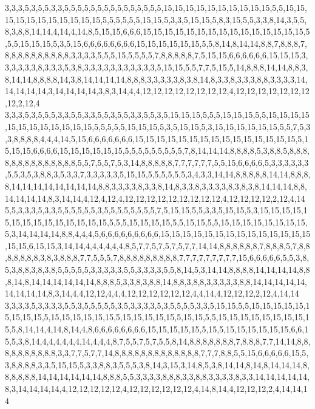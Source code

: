 3,3,3,5,3,5,5,3,3,5,5,5,5,5,5,5,5,5,5,5,5,5,5,5,15,15,15,15,15,15,15,15,15,15,5,5,15,15,15,15,15,15,15,15,15,15,15,5,5,5,5,5,5,15,15,5,3,3,5,15,15,5,8,3,15,5,5,3,3,8,14,3,5,5,8,3,8,8,14,14,4,14,4,14,8,5,15,15,6,6,6,15,15,15,15,15,15,15,15,15,15,15,15,15,15,15,5,5,5,15,15,15,5,3,5,15,6,6,6,6,6,6,6,6,15,15,15,15,15,15,5,5,8,14,8,14,14,8,8,7,8,8,8,7,8,8,8,8,8,8,8,8,8,8,3,3,3,3,5,5,5,15,5,5,5,5,7,8,8,8,8,8,7,5,15,15,6,6,6,6,6,6,15,15,15,3,3,3,3,3,3,8,3,3,3,5,3,8,3,3,3,3,3,3,3,3,3,3,3,5,15,15,5,5,7,7,5,15,5,14,8,8,8,14,14,8,8,3,8,14,14,8,8,8,8,14,3,8,14,14,14,14,8,8,8,3,3,3,3,3,8,3,8,14,8,3,3,8,3,3,3,8,8,3,3,3,3,14,14,14,14,14,3,14,14,14,14,3,8,3,14,4,4,12,12,12,12,12,12,12,12,4,12,12,12,12,12,12,12,12,2,12,4
3,3,3,5,3,5,5,5,3,3,5,5,3,3,5,5,3,5,5,3,3,5,5,3,5,15,15,15,5,5,5,15,15,15,5,5,15,15,15,15,15,15,15,15,15,15,15,15,5,5,5,5,5,15,15,15,5,3,5,15,15,5,3,15,15,15,15,15,15,5,5,7,5,3,3,8,8,8,8,4,4,4,14,5,15,6,6,6,6,6,6,6,15,15,15,15,15,15,15,15,15,15,15,15,15,15,15,5,15,15,15,6,6,6,6,15,15,15,15,15,15,5,5,5,5,5,5,5,5,5,7,8,14,14,14,8,8,8,8,5,3,8,8,5,8,8,8,8,8,8,8,8,8,8,8,8,8,8,5,5,7,5,5,7,5,3,14,8,8,8,8,8,7,7,7,7,7,7,5,5,15,6,6,6,6,5,3,3,3,3,3,3,5,5,3,5,3,8,8,3,5,3,3,7,3,3,3,3,3,5,15,15,5,5,5,5,5,5,3,4,3,3,14,14,8,8,8,8,8,14,14,8,8,8,8,14,14,14,14,14,14,14,14,8,8,3,3,3,3,8,3,3,8,14,8,3,3,8,3,3,3,3,8,3,8,3,8,14,14,14,8,8,14,14,14,14,8,3,14,14,4,12,4,12,4,12,12,12,12,12,12,12,12,12,4,12,12,12,12,2,12,4,14
5,5,3,3,3,5,3,3,5,5,5,5,5,5,3,5,5,5,5,5,5,5,5,7,5,15,15,5,5,3,3,5,15,15,5,3,15,15,15,15,15,15,15,15,15,15,15,15,15,15,5,5,5,15,15,15,15,5,5,15,15,5,5,15,15,15,15,15,15,15,15,5,3,14,14,14,14,8,8,4,4,4,5,6,6,6,6,6,6,6,6,6,15,15,15,15,15,15,15,15,15,15,15,15,15,15,15,15,6,15,15,3,14,14,4,4,4,4,4,4,8,5,7,7,5,7,5,7,5,7,7,14,14,8,8,8,8,8,8,7,8,8,8,5,7,8,8,8,8,8,8,8,3,8,3,8,8,8,7,7,5,5,5,7,8,8,8,8,8,8,8,8,8,7,7,7,7,7,7,7,7,7,15,6,6,6,6,6,5,5,3,8,5,3,8,8,3,8,3,8,5,5,5,5,5,3,3,3,3,3,5,5,3,3,3,3,5,5,8,14,5,3,14,14,8,8,8,8,14,14,14,14,8,8,8,14,8,14,14,14,14,14,14,8,8,8,5,3,3,8,3,8,8,14,8,8,3,8,8,3,3,3,3,3,8,8,14,14,14,14,14,14,14,14,14,8,3,14,4,4,12,12,4,4,4,12,12,12,12,12,12,4,4,14,4,12,12,12,2,12,4,14,14
3,3,3,3,5,3,3,3,3,5,5,3,5,5,5,5,5,3,5,3,3,3,3,5,3,5,5,5,5,3,3,5,15,15,5,5,15,15,15,15,15,15,15,15,15,5,15,15,15,15,15,15,5,15,15,15,15,15,5,15,15,5,5,15,15,15,15,15,15,15,15,15,5,8,14,14,4,14,8,14,4,8,6,6,6,6,6,6,6,6,15,15,15,15,15,5,15,5,15,15,15,15,15,15,6,6,15,5,3,8,14,4,4,4,4,4,4,14,4,4,4,8,7,5,5,7,5,7,5,5,8,14,8,8,8,8,8,8,8,7,8,8,8,7,7,14,14,8,8,8,8,8,8,8,8,8,8,3,3,7,7,5,7,7,14,8,8,8,8,8,8,8,8,8,8,8,8,8,7,7,7,8,8,5,5,15,6,6,6,6,6,15,5,3,8,8,8,8,3,3,5,15,15,5,3,3,8,8,3,5,5,5,3,8,14,3,15,3,14,8,5,3,8,14,14,8,14,8,14,14,14,8,8,8,8,8,8,14,14,14,14,14,14,8,8,8,5,5,3,3,3,3,8,8,8,3,3,8,8,3,3,3,3,8,3,3,14,14,14,14,14,8,3,14,14,14,14,4,12,12,12,12,12,4,12,12,12,12,12,12,4,14,8,14,4,12,12,12,2,4,14,14,14
